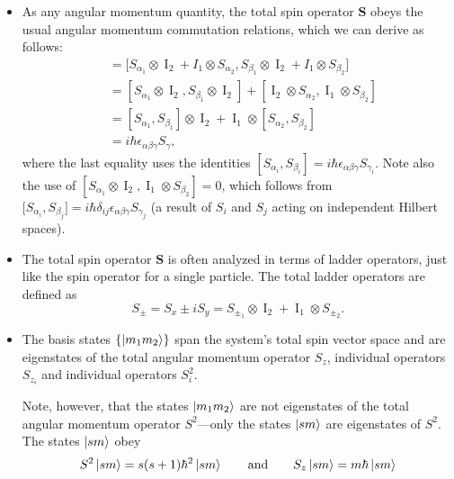 \documentclass[11pt, a4paper]{article}
\renewcommand{\vec}[1]{\bm{#1}}  %
\renewcommand{\S}{\vec{S}}  %
\newcommand{\II}{\operatorname{I}}  %
\begin{document}
\begin{itemize}
    \item As any angular momentum quantity, the total spin operator $ \vec{S} $ obeys the usual angular momentum commutation relations, which we can derive as follows:
    \begin{align*}
        [S_{\alpha}, S_{\beta}] &= \big[ S_{\alpha_{1}} \otimes \II_{2} + I_{1} \otimes S_{\alpha_{2}}, S_{\beta_{1}}\otimes \II_{2} + I_{1}\otimes S_{\beta_{2}} \big]\\
        & = [S_{\alpha_{1}} \otimes \II_{2}, S_{\beta_{1}}\otimes\II_{2}] + [\II_{2} \otimes S_{\alpha_{2}}, \II_{1} \otimes S_{\beta_{2}}]\\
        & = [S_{\alpha_{1}}, S_{\beta_{1}}] \otimes \II_{2} + \II_{1} \otimes [S_{\alpha_{2}}, S_{\beta_{2}}]\\
        & = i \hbar \epsilon_{\alpha\beta\gamma}S_{\gamma},
    \end{align*}
    where the last equality uses the identities $ [S_{\alpha_{i}}, S_{\beta_{i}}] = i \hbar \epsilon_{\alpha\beta\gamma}S_{\gamma_{i}} $. Note also the use of $ [S_{\alpha_{1}} \otimes \II_{2}, \II_{1} \otimes S_{\beta_{2}}] = 0 $, which follows from $ \big[S_{\alpha_{i}}, S_{\beta_{j}}\big] = i \hbar \delta_{ij}\epsilon_{\alpha \beta \gamma}S_{\gamma_{j}} $ (a result of $ S_{i} $ and $ S_{j} $ acting on independent Hilbert spaces).
    
    \item The total spin operator $ \S $ is often analyzed in terms of ladder operators, just like the spin operator for a single particle. The total ladder operators are defined as
    \begin{equation*}
        S_{\pm} = S_{x} \pm iS_{y} = S_{\pm_{1}} \otimes \II_{2} + \II_{1} \otimes S_{\pm_{2}}.
    \end{equation*}

    \item The basis states $ \{\ket{m_{1}m_{2}}\} $ span the system's total spin vector space and are eigenstates of the total angular momentum operator $ S_{z} $, individual operators $ S_{z_{i}} $ and individual operators $ S_{i}^{2} $. 

    Note, however, that the states $ \ket{m_{1}m_{2}} $ are not eigenstates of the total angular momentum operator $ S^{2} $---only the states $ \ket{sm} $ are eigenstates of $ S^{2} $. The states $ \ket{sm} $ obey
    \begin{equation*}
        S^{2}\ket{sm} = s(s+1)\hbar^{2}\ket{sm} \qquad \text{and} \qquad S_{z}\ket{sm} = m\hbar \ket{sm}
    \end{equation*}
    

\end{itemize}
\end{document}
